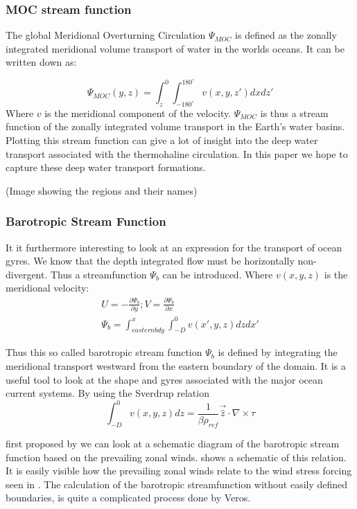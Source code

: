  \subsubsection{MOC stream function} \label{sec:MOCSTREAM}
 
 The global Meridional Overturning Circulation $\Psi_{MOC}$ is defined as the zonally integrated meridional volume transport of water in the worlds oceans. It can be written down as:
 
 $$
 \Psi_{MOC}(y,z) = \int_{z}^{0} \int_{-180^{\circ}}^{180^{\circ}} v(x,y,z') dx dz'
 $$
Where $v$ is the meridional component of the velocity.
$ \Psi_{MOC}$ is thus a stream function of the zonally integrated volume transport in the Earth's water basins. Plotting this stream function can give a lot of insight into the deep water transport associated with the thermohaline circulation. In this paper we hope to capture these deep water transport formations.

(Image showing the regions and their names)

\subsubsection{Barotropic Stream Function} \label{sec:BSF_theory}
It it furthermore interesting to look at an expression for the transport of ocean gyres. We know that the depth integrated flow must be horizontally non-divergent. Thus a streamfunction $\Psi_{b}$ can be introduced. Where $v(x,y,z)$ is the meridional velocity:
\begin{align}
U = -\frac{\partial \Psi_{b}}{\partial y}; V=\frac{\partial \Psi_{b}}{\partial x} \\
\Psi_{b} = \int_{eastern bdy}^{x} \int_{-D}^{0} v(x',y,z) dz dx'
\end{align}

Thus this so called barotropic stream function $\Psi_{b}$ is defined by integrating the meridional transport westward from the eastern boundary of the domain. It is a useful tool to look at the shape and gyres associated with the major ocean current systems. By using the Sverdrup relation
$$
\int_{-D}^{0}v(x,y,z) dz = \frac{1}{\beta \rho_{ref}}\vec{\hat{z}}\cdot \nabla \times \tau
$$

 first proposed by \cite{sverdrup1947wind} we can look at a schematic diagram of the barotropic stream function based on the prevailing zonal winds.  shows a schematic of this relation. It is easily visible how the prevailing zonal winds relate to the wind stress forcing seen in . The calculation of the barotropic streamfunction without easily defined boundaries, is quite a complicated process done by Veros. 
 
